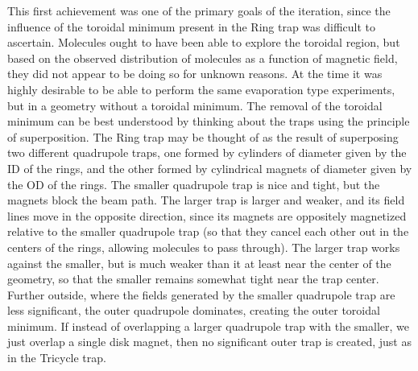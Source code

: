 \documentclass[defaultstyle,11pt]{thesis}
\begin{document}
This first achievement was one of the primary goals of the iteration, since the influence of the toroidal minimum present in the Ring trap was difficult to ascertain. 
Molecules ought to have been able to explore the toroidal region, but based on the observed distribution of molecules as a function of magnetic field, they did not appear to be doing so for unknown reasons.
At the time it was highly desirable to be able to perform the same evaporation type experiments, but in a geometry without a toroidal minimum.
The removal of the toroidal minimum can be best understood by thinking about the traps using the principle of superposition.
The Ring trap may be thought of as the result of superposing two different quadrupole traps, one formed by cylinders of diameter given by the ID of the rings, and the other formed by cylindrical magnets of diameter given by the OD of the rings.
The smaller quadrupole trap is nice and tight, but the magnets block the beam path.
The larger trap is larger and weaker, and its field lines move in the opposite direction, since its magnets are oppositely magnetized relative to the smaller quadrupole trap (so that they cancel each other out in the centers of the rings, allowing molecules to pass through).
The larger trap works against the smaller, but is much weaker than it at least near the center of the geometry, so that the smaller remains somewhat tight near the trap center.
Further outside, where the fields generated by the smaller quadrupole trap are less significant, the outer quadrupole dominates, creating the outer toroidal minimum.
If instead of overlapping a larger quadrupole trap with the smaller, we just overlap a single disk magnet, then no significant outer trap is created, just as in the Tricycle trap.
\end{document}
